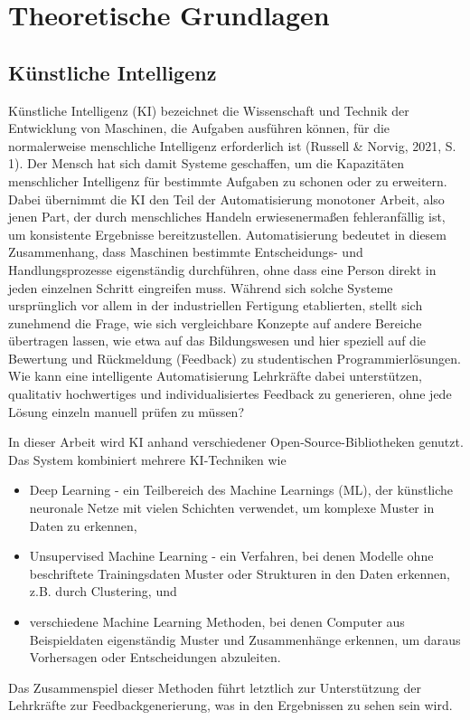 \chapter{Theoretische Grundlagen}

\section{Künstliche Intelligenz}
Künstliche Intelligenz (KI) bezeichnet die Wissenschaft und Technik der Entwicklung von Maschinen, die Aufgaben ausführen können, für die normalerweise menschliche Intelligenz erforderlich ist (Russell \& Norvig, 2021, S. 1). Der Mensch hat sich damit Systeme geschaffen, um die Kapazitäten menschlicher Intelligenz für bestimmte Aufgaben zu schonen oder zu erweitern. Dabei übernimmt die KI den Teil der Automatisierung monotoner Arbeit, also jenen Part, der durch menschliches Handeln erwiesenermaßen fehleranfällig ist, um konsistente Ergebnisse bereitzustellen. Automatisierung bedeutet in diesem Zusammenhang, dass Maschinen bestimmte Entscheidungs- und Handlungsprozesse eigenständig durchführen, ohne dass eine Person direkt in jeden einzelnen Schritt eingreifen muss. Während sich solche Systeme ursprünglich vor allem in der industriellen Fertigung etablierten, stellt sich zunehmend die Frage, wie sich vergleichbare Konzepte auf andere Bereiche übertragen lassen, wie etwa auf das Bildungswesen und hier speziell auf die Bewertung und Rückmeldung (Feedback) zu studentischen Programmierlösungen. Wie kann eine intelligente Automatisierung Lehrkräfte dabei unterstützen, qualitativ hochwertiges und individualisiertes Feedback zu generieren, ohne jede Lösung einzeln manuell prüfen zu müssen?

In dieser Arbeit wird KI anhand verschiedener Open-Source-Bibliotheken genutzt. Das System kombiniert mehrere KI-Techniken wie
\begin{itemize}
    \item Deep Learning - ein Teilbereich des Machine Learnings (ML), der künstliche neuronale Netze mit vielen Schichten verwendet, um komplexe Muster in Daten zu erkennen,
    \item Unsupervised Machine Learning - ein Verfahren, bei denen Modelle ohne beschriftete Trainingsdaten Muster oder Strukturen in den Daten erkennen, z.B. durch Clustering, und
    \item verschiedene Machine Learning Methoden, bei denen Computer aus Beispieldaten eigenständig Muster und Zusammenhänge erkennen, um daraus Vorhersagen oder Entscheidungen abzuleiten.
\end{itemize}
Das Zusammenspiel dieser Methoden führt letztlich zur Unterstützung der Lehrkräfte zur Feedbackgenerierung, was in den Ergebnissen zu sehen sein wird.

